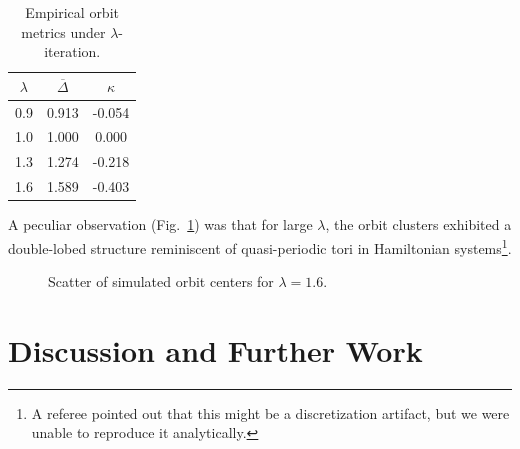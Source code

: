 \documentclass{amsart}
\begin{document}
\begin{table}[htbp]
\centering
\begin{tabular}{|c|c|c|}
\hline
$\lambda$ & $\overline{\Delta}$ & $\kappa$ \\
\hline
0.9 & 0.913 & -0.054 \\
1.0 & 1.000 &  0.000 \\
1.3 & 1.274 & -0.218 \\
1.6 & 1.589 & -0.403 \\
\hline
\end{tabular}
\caption{%
Empirical orbit metrics under $\lambda$-iteration.%
}
\label{tab:data}
\end{table}

A peculiar %
observation (Fig.~\ref{fig:scatter}) was %
that for large $\lambda$, the orbit clusters exhibited %
a double-lobed structure reminiscent of quasi-periodic tori in Hamiltonian systems\footnote{A referee pointed out that this might be a discretization artifact, but we were unable to reproduce it analytically.}. 

\begin{figure}[htbp]
\centering
{}
\caption{Scatter of simulated orbit centers for $\lambda=1.6$.}
\label{fig:scatter}
\end{figure}

\section{Discussion and Further Work}
\end{document}
